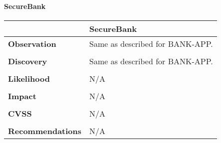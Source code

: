 \paragraph{SecureBank} \mbox{}
\begin{longtable*}{p{.30\textwidth} | p{.70\textwidth}}
    \hline
    & \textbf{SecureBank} \\
    \hline
    \textbf{Observation} &
        Same as described for BANK-APP.
    \\\\
    \textbf{Discovery} &
    	Same as described for BANK-APP.
    \\\\
    \textbf{Likelihood} &
       N/A
    \\\\
    \textbf{Impact} &
       N/A
    \\\\
    \textbf{CVSS} &
       N/A
     \\\\
     \textbf{Recommendations} &
      N/A\\
    \hline
\end{longtable*}
\clearpage